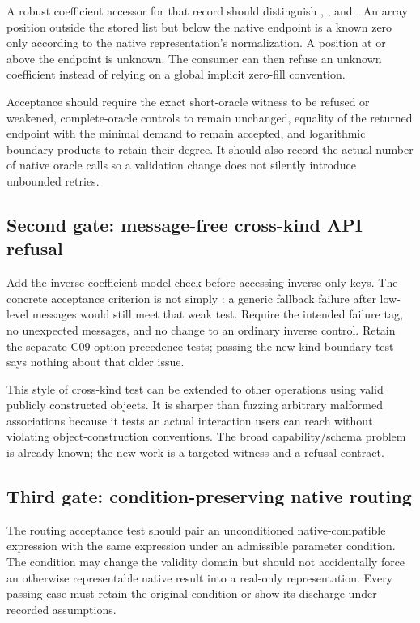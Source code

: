 \documentclass[11pt,letterpaper]{article}
\theoremstyle{definition}\newtheorem{definition}[proposition]{Definition}
\begin{document}
A robust coefficient accessor for that record should distinguish
, , and
. An array position outside the stored list but below
the native endpoint is a known zero only according to the native representation's
normalization. A position at or above the endpoint is unknown. The consumer can
then refuse an unknown coefficient instead of relying on a global implicit
zero-fill convention.

Acceptance should require the exact short-oracle witness to be refused or
weakened, complete-oracle controls to remain unchanged, equality of the returned
endpoint with the minimal demand to remain accepted, and logarithmic boundary
products to retain their degree. It should also record the actual number of
native oracle calls so a validation change does not silently introduce
unbounded retries.

\subsection{Second gate: message-free cross-kind API refusal}
Add the inverse coefficient model check before accessing inverse-only keys.
The concrete acceptance criterion is not simply : a generic
fallback failure after low-level messages would still meet that weak test.
Require the intended failure tag, no unexpected messages, and no change to an
ordinary inverse control. Retain the separate C09 option-precedence tests;
passing the new kind-boundary test says nothing about that older issue.

This style of cross-kind test can be extended to other operations using valid
publicly constructed objects. It is sharper than fuzzing arbitrary malformed
associations because it tests an actual interaction users can reach without
violating object-construction conventions. The broad capability/schema problem
is already known; the new work is a targeted witness and a refusal contract.

\subsection{Third gate: condition-preserving native routing}
The routing acceptance test should pair an unconditioned native-compatible
expression with the same expression under an admissible parameter condition.
The condition may change the validity domain but should not accidentally force
an otherwise representable native result into a real-only representation.
Every passing case must retain the original condition or show its discharge
under recorded assumptions.
\end{document}
